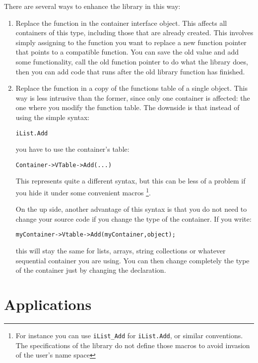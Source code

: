 \documentclass[12pt,a4paper]{memoir} %
\begin{document}
{{There are several ways to enhance the library in this way:
\begin{enumerate}
\item Replace the function in the container interface object. This affects all containers of this type, including those that are already created. This involves simply assigning to the function you want to replace a new function pointer that points to a compatible function. You can save the old value and add some functionality, call the old function pointer to do what the library does, then you can add code that runs after the old library function has finished.
\item Replace the function in a copy of the functions table of a single object. This way is less intrusive than the former, since only one container is affected: the one where you modify the function table. The downside is that instead of using the simple syntax:\par\noindent \texttt{iList.Add} \par you have to use the container's table:\par \texttt{Container->VTable->Add(...)} \par This represents quite a different syntax, but this can be less of a problem if you hide it under some convenient macros \footnote{For instance you can use \texttt{iList\_Add} for \texttt{iList.Add}, or similar conventions. The specifications of the library do not define those macros to avoid invasion of the user's name space}.

On the up side, another advantage of this syntax is that you do not need to change your source code if you change the type of the container. If you write: \par \noindent \texttt{myContainer->Vtable->Add(myContainer,object);}\par \noindent this will stay the same for lists, arrays, string collections or whatever sequential container you are using. You can then change completely the type of the container just by changing the declaration.
\end{enumerate}

\chapter{Applications}
}}
\end{document}
